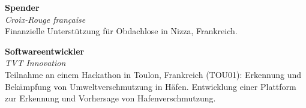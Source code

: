 \textbf{Spender}  \\
\textit{Croix-Rouge française} \\
\small
Finanzielle Unterstützung für Obdachlose in Nizza, Frankreich.
\vspace{1ex}

\textbf{Softwareentwickler}  \\
\textit{TVT Innovation} \\
\small
Teilnahme an einem Hackathon in Toulon, Frankreich (TOU01): Erkennung und Bekämpfung von Umweltverschmutzung in Häfen. Entwicklung einer Plattform zur Erkennung und Vorhersage von Hafenverschmutzung.
